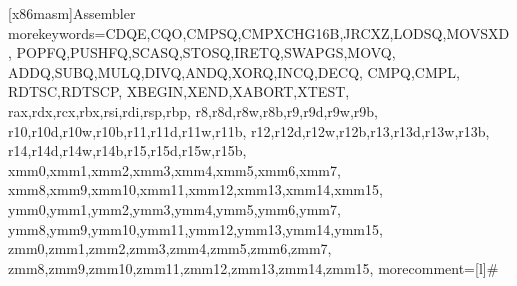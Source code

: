 \newcommand{\XXX}[1]{}

\newcommand{\asm}[1]{\texttt{#1}}
\newcommand{\code}[1]{\texttt{\detokenize{#1}}}
\newcommand{\command}[1]{\texttt{\detokenize{#1}}}
\newcommand{\syscall}[1]{\texttt{\detokenize{#1}}}




    [x86masm]{Assembler}
    {morekeywords={CDQE,CQO,CMPSQ,CMPXCHG16B,JRCXZ,LODSQ,MOVSXD,
		POPFQ,PUSHFQ,SCASQ,STOSQ,IRETQ,SWAPGS,MOVQ,
		ADDQ,SUBQ,MULQ,DIVQ,ANDQ,XORQ,INCQ,DECQ,
		CMPQ,CMPL,
		RDTSC,RDTSCP,
		XBEGIN,XEND,XABORT,XTEST,
		rax,rdx,rcx,rbx,rsi,rdi,rsp,rbp,
		r8,r8d,r8w,r8b,r9,r9d,r9w,r9b,
		r10,r10d,r10w,r10b,r11,r11d,r11w,r11b,
		r12,r12d,r12w,r12b,r13,r13d,r13w,r13b,
		r14,r14d,r14w,r14b,r15,r15d,r15w,r15b,
		xmm0,xmm1,xmm2,xmm3,xmm4,xmm5,xmm6,xmm7,
		xmm8,xmm9,xmm10,xmm11,xmm12,xmm13,xmm14,xmm15,
		ymm0,ymm1,ymm2,ymm3,ymm4,ymm5,ymm6,ymm7,
		ymm8,ymm9,ymm10,ymm11,ymm12,ymm13,ymm14,ymm15,
		zmm0,zmm1,zmm2,zmm3,zmm4,zmm5,zmm6,zmm7,
		zmm8,zmm9,zmm10,zmm11,zmm12,zmm13,zmm14,zmm15},
	morecomment=[l]\#
}




